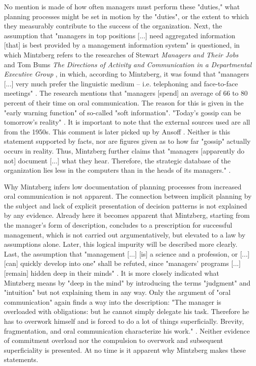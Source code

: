 \documentclass[a4paper,12pt]{article}
\begin{document}
No mention is made of how often managers must perform these "duties," what
planning processes might be set in motion by the "duties", or the extent to
which they measurably contribute to the success of the organization. Next, the
assumption that "managers in top positions [...] need aggregated information
[that] is best provided by a management information system" is questioned, in
which Mintzberg refers to the researches of Stewart \emph{Managers and Their
  Jobs} \cite{stewart2} and Tom Bums \emph{The Directions of Activity and
  Communication in a Departmental Executive Group} \cite{burns}, in which,
according to Mintzberg, it was found that "managers [...] very much prefer the
linguistic medium -- i.e. telephoning and face-to-face meetings"
\cite[p. 26]{Mintzberg}.  The research mentions that "managers [spend] an
average of 66 to 80 percent of their time on oral communication. The reason
for this is given in the "early warning function" of so-called "soft
information".  "Today's gossip can be tomorrow's reality"
\cite[p. 27]{Mintzberg}. It is important to note that the external sources
used are all from the 1950s.  This comment is later picked up by Ansoff
\cite{ansoff}.  Neither is this statement supported by facts, nor are figures
given as to how far "gossip" actually occurs in reality. Thus, Mintzberg
further claims that "managers [apparently do not] document [...]  what they
hear. Therefore, the strategic database of the organization lies less in the
computers than in the heads of its managers."  \cite[p. 27]{Mintzberg}.

Why Mintzberg infers low documentation of planning processes from increased
oral communication is not apparent. The connection between implicit planning
by the subject and lack of explicit presentation of decision patterns is not
explained by any evidence. Already here it becomes apparent that Mintzberg,
starting from the manager's form of description, concludes to a prescription
for successful management, which is not carried out argumentatively, but
elevated to a law by assumptions alone. Later, this logical impurity will be
described more clearly. Last, the assumption that "management [...] [is] a
science and a profession, or [...] [can] quickly develop into one"
{}\cite[p.28]{Mintzberg} shall be refuted, since "managers' programs [...]
[remain] hidden deep in their minds" \cite[p. 28]{Mintzberg}. It is more
closely indicated what Mintzberg means by "deep in the mind" by introducing
the terms "judgment" and "intuition" but not explaining them in any way. Only
the argument of "oral communication" again finds a way into the description:
"The manager is overloaded with obligations: but he cannot simply delegate his
task. Therefore he has to overwork himself and is forced to do a lot of things
superficially. Brevity, fragmentation, and oral communication characterize his
work." \cite[p. 28]{Mintzberg}. Neither evidence of commitment overload nor
the compulsion to overwork and subsequent superficiality is presented. At no
time is it apparent why Mintzberg makes these statements.
\end{document}
